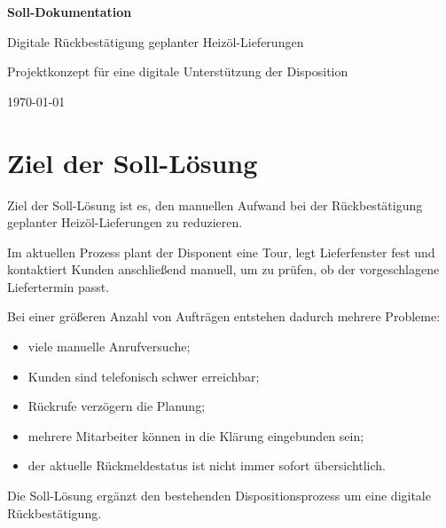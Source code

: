 \documentclass[12pt,a4paper]{article}
\begin{document}
	
	\begin{titlepage}
		\centering
		\vspace*{3cm}
		
		{\Huge\bfseries Soll-Dokumentation\par}
		\vspace{1cm}
		
		{\LARGE Digitale Rückbestätigung geplanter Heizöl-Lieferungen\par}
		\vspace{2cm}
		
		{\large Projektkonzept für eine digitale Unterstützung der Disposition\par}
		
		\vfill
		
		{\large \today\par}
	\end{titlepage}
	
	\tableofcontents
	\newpage
	
	\section{Ziel der Soll-Lösung}
	
	Ziel der Soll-Lösung ist es, den manuellen Aufwand bei der Rückbestätigung geplanter Heizöl-Lieferungen zu reduzieren.
	
	Im aktuellen Prozess plant der Disponent eine Tour, legt Lieferfenster fest und kontaktiert Kunden anschließend manuell, um zu prüfen, ob der vorgeschlagene Liefertermin passt.
	
	Bei einer größeren Anzahl von Aufträgen entstehen dadurch mehrere Probleme:
	
	\begin{itemize}
		\item viele manuelle Anrufversuche;
		\item Kunden sind telefonisch schwer erreichbar;
		\item Rückrufe verzögern die Planung;
		\item mehrere Mitarbeiter können in die Klärung eingebunden sein;
		\item der aktuelle Rückmeldestatus ist nicht immer sofort übersichtlich.
	\end{itemize}
	
	Die Soll-Lösung ergänzt den bestehenden Dispositionsprozess um eine digitale Rückbestätigung.
	
\end{document}
